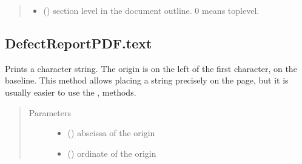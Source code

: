 \documentclass[letterpaper,10pt,english]{sphinxmanual}
\begin{document}
\begin{fulllineitems}
\begin{fulllineitems}
\begin{quote}
\begin{description}
\begin{itemize}
\item {} 
\sphinxAtStartPar
{} () \textendash{} section level in the document outline. 0 means top\sphinxhyphen{}level.

\end{itemize}

\end{description}\end{quote}

\end{fulllineitems}



\subsection{DefectReportPDF.text}
\label{\detokenize{generated/quality_assessment.quality_pdf_report.DefectReportPDF.text:defectreportpdf-text}}\label{\detokenize{generated/quality_assessment.quality_pdf_report.DefectReportPDF.text::doc}}

\begin{fulllineitems}
\label{\detokenize{generated/quality_assessment.quality_pdf_report.DefectReportPDF.text:quality_assessment.quality_pdf_report.DefectReportPDF.text}}
\sphinxAtStartPar
Prints a character string. The origin is on the left of the first character,
on the baseline. This method allows placing a string precisely on the page,
but it is usually easier to use the ,  methods.
\begin{quote}\begin{description}
\item[{Parameters}] \leavevmode\begin{itemize}
\item {} 
\sphinxAtStartPar
{} () \textendash{} abscissa of the origin

\item {} 
\sphinxAtStartPar
{} () \textendash{} ordinate of the origin


\end{itemize}
\end{description}
\end{quote}
\end{fulllineitems}
\end{fulllineitems}
\end{document}
